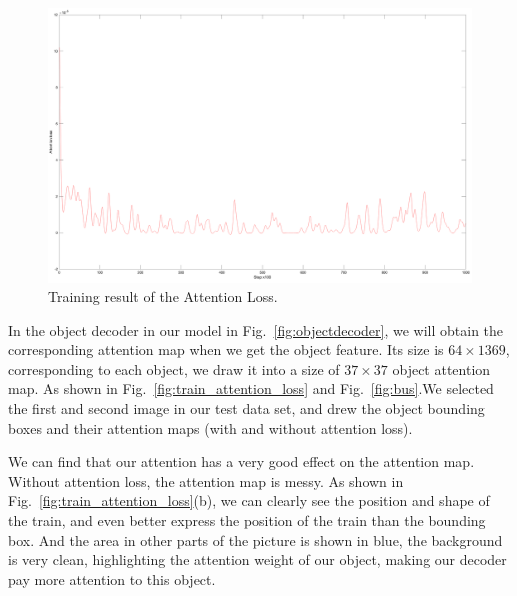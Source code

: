 \begin{figure}[h!]
	\centering
	\includegraphics[width=0.8\linewidth]{figures/result/attention_loss}
	\caption[Training result of the Attention Loss]{Training result of the Attention Loss.}
	\label{fig:attention_loss_result}
\end{figure}

In the object decoder in our model in Fig.~\ref{fig:objectdecoder}, we will obtain the corresponding attention map when we get the object feature. Its size is $ 64\times1369 $, corresponding to each object, we draw it into a size of $ 37\times37 $ object attention map. As shown in Fig.~\ref{fig:train_attention_loss} and Fig.~\ref{fig:bus}.We selected the first and second image in our test data set, and drew the object bounding boxes and their attention maps (with and without attention loss).

We can find that our attention has a very good effect on the attention map. Without attention loss, the attention map is messy. As shown in Fig.~\ref{fig:train_attention_loss}(b), we can clearly see the position and shape of the train, and even better express the position of the train than the bounding box. And the area in other parts of the picture is shown in blue, the background is very clean, highlighting the attention weight of our object, making our decoder pay more attention to this object.


